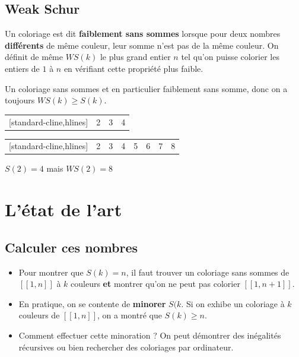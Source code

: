 \documentclass[graphics]{beamer}
\begin{document}
\subsection{Weak Schur}

\begin{frame}
	\begin{tcolorbox}[colback=red!5,colframe=red!40!black,title=Définition]
		Un coloriage est dit \textbf{faiblement sans sommes} lorsque pour deux nombres \textbf{différents} de même couleur,
		leur somme n'est pas de la même couleur. On définit de même \(WS(k)\) le plus grand entier \(n\) tel qu'on puisse colorier les entiers de
		\(1\) à \(n\) en vérifiant cette propriété plus faible.
	\end{tcolorbox}
	\pause
	Un coloriage sans sommes et en particulier faiblement sans somme, donc on a toujours \(WS(k) \geq S(k)\).\\
	\pause 
	\begin{center}
	\begin{NiceTabular}{|*{4}{c|}}[standard-cline,hlines]
		\CodeBefore
		 & 2 & 3 & 4 \\
	\end{NiceTabular}

	\begin{NiceTabular}{|*{8}{c|}}[standard-cline,hlines]
		\CodeBefore
		 & 2 & 3 & 4 & 5 & 6 & 7 & 8 \\
	\end{NiceTabular}
	\end{center}
	\(S(2) = 4\) mais \(WS(2) = 8\)
\end{frame}

\section{L'état de l'art}
\subsection{Calculer ces nombres}

\begin{frame}
	\begin{itemize}
	\item Pour montrer que \(S(k) = n\), il faut trouver un coloriage sans sommes de \([\![1,n]\!]\) à \(k\) couleurs
	\textbf{et} montrer qu'on ne peut pas colorier \([\![1,n+1]\!]\). 
	\pause
	\item En pratique, on se contente de \textbf{minorer} \(S(k\). Si on exhibe un coloriage à \(k\) couleurs de 
	\([\![1,n]\!]\), on a montré que \(S(k) \geq n\). 
	\pause
	\item Comment effectuer cette minoration ? On peut démontrer des inégalités récursives ou bien rechercher des coloriages
	par ordinateur.
	\end{itemize}
\end{frame}
\end{document}
